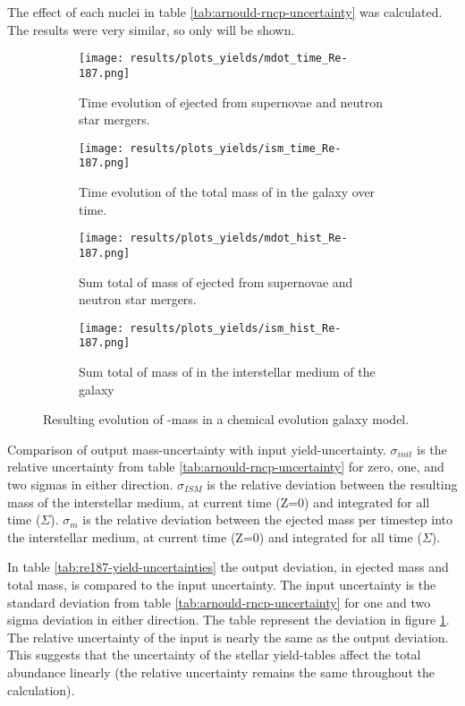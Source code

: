 The effect of each nuclei in table \ref{tab:arnould-rncp-uncertainty} was calculated.
The results were very similar, so only  will be shown.
\setlength{\subfigwidth}{0.5\textwidth}
\begin{figure}[h]
  \begin{subfigure}{\subfigwidth}
    \centering
    \texttt{[image: results/plots\_yields/mdot\_time\_Re-187.png]}
    \caption{Time evolution of  ejected from supernovae and neutron star mergers.}
  \end{subfigure}
  \begin{subfigure}{\subfigwidth}
    \centering
    \texttt{[image: results/plots\_yields/ism\_time\_Re-187.png]}
    \caption{Time evolution of the total mass of  in the galaxy over time.}
  \end{subfigure}
  \begin{subfigure}{\subfigwidth}
    \centering
    \texttt{[image: results/plots\_yields/mdot\_hist\_Re-187.png]}
    \caption{Sum total of mass of  ejected from supernovae and neutron star mergers.}
  \end{subfigure}
  \begin{subfigure}{\subfigwidth}
    \centering
    \texttt{[image: results/plots\_yields/ism\_hist\_Re-187.png]}
    \caption{Sum total of mass of  in the interstellar medium of the galaxy}
  \end{subfigure}
  \caption[effect of nucelar uncertainties]{\label{fig:re187-yield-uncertainties}
    Resulting evolution of -mass in a chemical evolution galaxy model.}
\end{figure}
\begin{table}
  \centering
  
  \caption[effect of nuclear uncertainties]{\label{tab:re187-yield-uncertainties}
    Comparison of output mass-uncertainty with input yield-uncertainty.
    $\sigma_{init}$ is the relative uncertainty from table \ref{tab:arnould-rncp-uncertainty} for zero, one, and two sigmas in either direction.
    $\sigma_{ISM}$ is the relative deviation between the resulting mass of the interstellar medium, at current time (Z=0) and integrated for all time ($\Sigma$).
    $\sigma_{\dot{m}}$ is the relative deviation between the ejected mass per timestep into the interstellar medium, at current time (Z=0) and integrated for all time ($\Sigma$).
  }
\end{table}
In table \ref{tab:re187-yield-uncertainties} the output deviation, in ejected mass and total mass, is compared to the input uncertainty.
The input uncertainty is the standard deviation from table \ref{tab:arnould-rncp-uncertainty} for one and two sigma deviation in either direction.
The table represent the deviation in figure \ref{fig:re187-yield-uncertainties}.
The relative uncertainty of the input is nearly the same as the output deviation.
This suggests that the uncertainty of the stellar yield-tables affect the total abundance linearly (the relative uncertainty remains the same throughout the calculation).
\FloatBarrier

